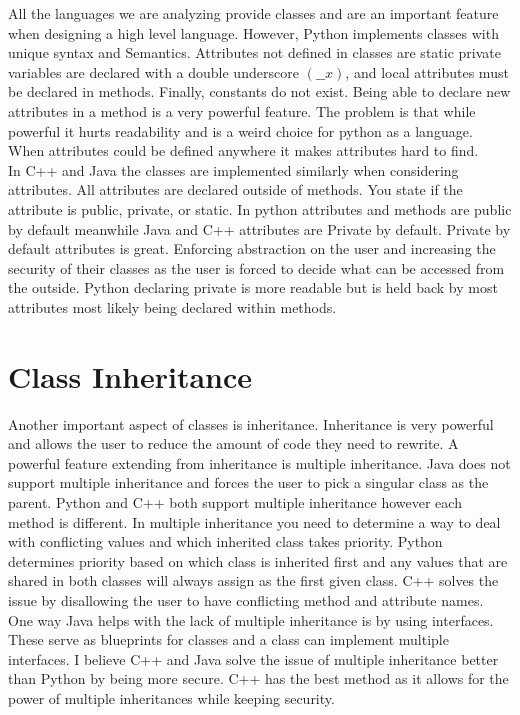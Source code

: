 \documentclass[sigconf, nonacm, authorversion, language=english, 12pt]{acmart}
\def\tab{\hspace*{5mm}}
\begin{document}
\tab All the languages we are analyzing provide classes and are an important feature when designing a high level language. However, Python implements classes with unique
syntax and Semantics. Attributes not defined in classes are static private variables are declared with a double underscore $(\_\_x)$, and local
attributes must be declared in methods. Finally, constants do not exist. Being able to declare new attributes in a method is a very powerful feature.
The problem is that while powerful it hurts readability and is a weird choice for python as a language. When attributes could be defined anywhere it makes attributes hard to find.\\

\tab In C++ and Java the classes are implemented similarly when considering attributes. All attributes are declared outside of methods. You state if the attribute is public, private, or static.
In python attributes and methods are public by default meanwhile Java and C++ attributes are Private by default. Private by default attributes is great. Enforcing abstraction on the user and
increasing the security of their classes as the user is forced to decide what can be accessed from the outside. Python declaring private is more readable but is held back by most attributes
most likely being declared within methods.\\

\section{Class Inheritance}

\tab Another important aspect of classes is inheritance. Inheritance is very powerful and allows the user to reduce the amount of code they need to rewrite. A powerful feature extending from
inheritance is multiple inheritance. Java does not support multiple inheritance and forces the user to pick a singular class as the parent. Python and C++ both support multiple inheritance
however each method is different. In multiple inheritance you need to determine a way to deal with conflicting values and which inherited class takes priority. Python determines priority based
on which class is inherited first and any values that are shared in both classes will always assign as the first given class. C++ solves the issue by disallowing the user to have conflicting
method and attribute names. One way Java helps with the lack of multiple inheritance is by using interfaces. These serve as blueprints for classes and a class can implement multiple interfaces.
I believe C++ and Java solve the issue of multiple inheritance better than Python by being more secure. C++ has the best method as it allows for the power of
multiple inheritances while keeping security.\\
\end{document}
